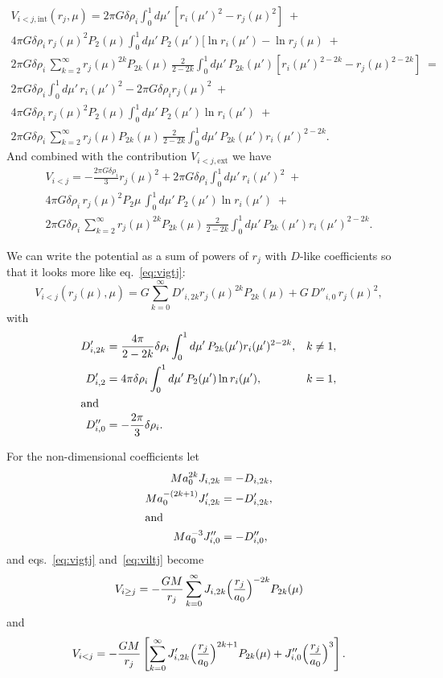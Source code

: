 \documentclass[amsmath,amsfonts,rmp,letterpaper]{revtex4}
\renewcommand{\inf}{\infty}
\newcommand{\ptk}{P_{2k}}
\newcommand{\sumonk}{\sum_{k=0}^{\inf}}
\newcommand{\dro}{\delta\rho}
\newcommand{\mupint}{\int_{0}^{1}d\mu'\,}
\newcommand{\tpi}{2\pi}
\begin{document}
\begin{multline}
V_{i<j,\mathrm{int}}(r_j,\mu) =
\tpi{G}\dro_i\mupint[r_i(\mu')^2 - r_j(\mu)^2]\; +\\
4\pi{G}\dro_i\,r_j(\mu)^2{}P_2(\mu)\mupint{}P_2(\mu')[\ln{r_i(\mu')} -
\ln{r_j(\mu)}\; + \\
\tpi{G}\dro_i\,\sum_{k=2}^{\inf}r_j(\mu)^{2k}\ptk(\mu)\,\frac{2}{2 -2k}
\mupint\ptk(\mu')[r_i(\mu')^{2 - 2k} - r_j(\mu)^{2 - 2k}]\; = \\
\tpi{G}\dro_i\mupint{}r_i(\mu')^2 - \tpi{G}\dro_i{}r_j(\mu)^2\; + \\ 
4\pi{G}\dro_i\,r_j(\mu)^2{}P_2(\mu)\mupint{}P_2(\mu')\ln{r_i(\mu')}\; + \\
2\pi{G}\dro_i\,\sum_{k=2}^{\inf}r_j(\mu)\ptk(\mu)\,\frac{2}{2 - 2k}
\mupint\ptk(\mu')r_i(\mu')^{2 - 2k}.
\end{multline}
And combined with the contribution $V_{i<j,\mathrm{ext}}$ we have
\begin{multline}
V_{i<j} = -\frac{2\pi{G}\dro_i}{3}r_j(\mu)^2 +
2\pi{G}\dro_i\mupint{}r_i(\mu')^2\; + \\
4\pi{G}\dro_i\,r_j(\mu)^2P_2{\mu}\,\mupint{}P_2(\mu')\ln{r_i(\mu')}\; + \\
2\pi{G}\dro_i\,\sum_{k=2}^{\inf}r_j(\mu)^{2k}\ptk(\mu)\,
\frac{2}{2 - 2k}\mupint\ptk(\mu')r_i(\mu')^{2 - 2k}.
\end{multline}

We can write the potential as a sum of powers of $r_j$ with $D$-like coefficients
so that it looks more like eq.~\eqref{eq:vigtj}:
\begin{equation}\label{eq:viltj}
V_{i<j}(r_j(\mu),\mu) = G\sum_{k=0}^{\inf}D'_{i,2k}r_j(\mu)^{2k}\ptk(\mu) + 
G\,D''_{i,0}\,r_j(\mu)^2,
\end{equation}
with
\begin{subequations}
\begin{align}
D'_{i,2k} &= \frac{4\pi}{2 - 2k}\dro_i
\mupint\ptk(\mu')r_i(\mu')^{2 - 2k}, & k\ne{1},\\
D'_{i,2} &= 4\pi\dro_i\mupint{}P_2(\mu')\ln{r_i(\mu')}, & k=1,\\
\intertext{and}
D''_{i,0} &= -\frac{2\pi}{3}\dro_i.
\end{align}
\end{subequations}

For the non-dimensional coefficients let
\begin{subequations}
\begin{align}
Ma_0^{2k}J_{i,2k} &= -D_{i,2k},\\
Ma_0^{-(2k+1)}J'_{i,2k} &= -D'_{i,2k},\\
\intertext{and}
Ma_0^{-3}J''_{i,0} &= -D''_{i,0},
\end{align}
\end{subequations}
and eqs.~\eqref{eq:vigtj} and~\eqref{eq:viltj} become
\begin{equation}
V_{i\ge{j}} = -\frac{GM}{r_j}
\sumonk{}J_{i,2k}\Bigl(\frac{r_j}{a_0}\Bigr)^
{-2k}\ptk(\mu)
\end{equation}
and
\begin{equation}
V_{i<j} = -\frac{GM}{r_j}\left[
\sumonk{}J'_{i,2k}\Bigl(\frac{r_j}{a_0}\Bigr)^{2k+1}\ptk(\mu) +
J''_{i,0}\Bigl(\frac{r_j}{a_0}\Bigr)^3 \right].
\end{equation}
\end{document}
